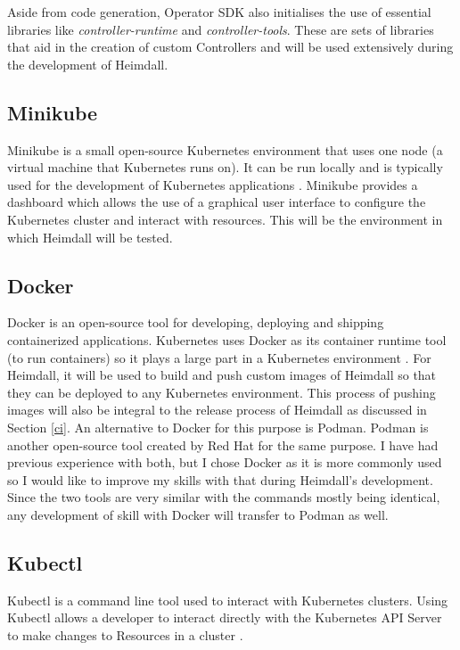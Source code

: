 \documentclass{article}
\begin{document}
Aside from code generation, Operator SDK also initialises the use of essential libraries like \emph{controller-runtime} and \emph{controller-tools}. These are sets of libraries that aid in the creation of custom Controllers and will be used extensively during the development of Heimdall.


\subsection{Minikube}

Minikube is a small open-source Kubernetes environment that uses one node (a virtual machine that Kubernetes runs on). It can be run locally and is typically used for the development of Kubernetes applications \cite{minikube-docs}. Minikube provides a dashboard which allows the use of a graphical user interface to configure the Kubernetes cluster and interact with resources. This will be the environment in which Heimdall will be tested. 

 
\subsection{Docker}

Docker is an open-source tool for developing, deploying and shipping containerized applications. Kubernetes uses Docker as its container runtime tool (to run containers) so it plays a large part in a Kubernetes environment \cite{docker-overview}. For Heimdall, it will be used to build and push  custom images of Heimdall so that they can be deployed to any Kubernetes environment. This process of pushing images will also be integral to the release process of Heimdall as discussed in Section \ref{ci}. An alternative to Docker for this purpose is Podman. Podman is another open-source tool created by Red Hat for the same purpose. I have had previous experience with both, but I chose Docker as it is more commonly used so I would like to improve my skills with that during Heimdall's development. Since the two tools are very similar with the commands mostly being identical, any development of skill with Docker will transfer to Podman as well.


\subsection{Kubectl}

Kubectl is a command line tool used to interact with Kubernetes clusters. Using Kubectl allows a developer to interact directly with the Kubernetes API Server to make changes to Resources in a cluster \cite{k8s-tools}.
\end{document}
